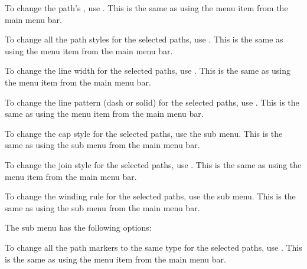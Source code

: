 
To change the path's , use
. This is the same as using the
 menu item from the main menu bar.


To change all the path styles for the selected paths,
use . This is the same as using the
 menu item from the main menu bar.


To change the line width for the selected paths,
use . This is the same as using the
 menu item from the main menu bar.


To change the line pattern (dash or solid) for the selected paths,
use . This is the same as using the
 menu item from the main menu bar.


To change the cap style for the selected paths,
use the  sub menu. This is the same as using the
 sub menu from the main menu bar.


To change the join style for the selected paths,
use . This is the same as using the
 menu item from the main menu bar.

To change the winding rule for the selected paths,
use the  sub menu. This is the same as using the
 sub menu from the main menu bar.


The  sub menu has the following options:


To change all the path markers to the same type for the selected paths,
use . This is the same as using the
 menu item from the main menu bar.


